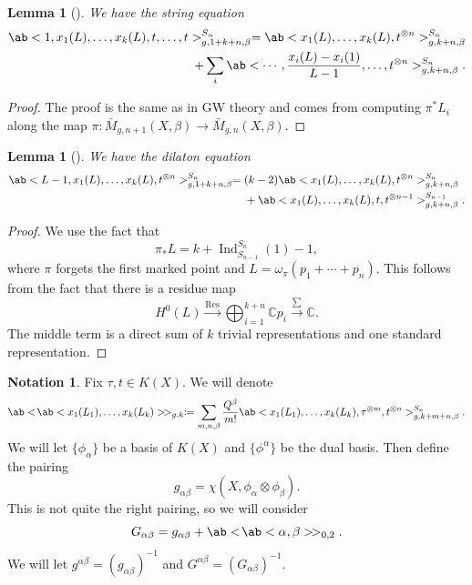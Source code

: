 \documentclass{amsart}
\newtheorem{lem}[thm]{Lemma}
\theoremstyle{definition}
\newtheorem{notn}[thm]{Notation}
\theoremstyle{remark}
\theoremstyle{plain}
\theoremstyle{definition}
\theoremstyle{remark}
\newcommand{\C}{\mathbb{C}}
\newcommand{\on}[1]{\operatorname{#1}}
\newcommand{\1}{\mathbf{1}}
\newcommand{\2}{\mathbf{2}}
\newcommand{\3}{\mathbf{3}}
\begin{document}
\begin{lem}[{\cite{GiventalK7}}]
    We have the \textit{string equation}
    \begin{align*}
        \ab< 1, x_1(L), \ldots, x_k(L), t, \ldots, t >_{g, 1+k+n, \beta}^{S_n} = \ab<x_1(L), \ldots, x_k(L), t^{\otimes n}>^{S_n}_{g,k+n,\beta} \\
        + \sum_i \ab< \cdots, \frac{x_i(L) - x_i(1)}{L-1}, \ldots, t^{\otimes n}>^{S_n}_{g,k+n,\beta}. 
    \end{align*}
\end{lem}

\begin{proof}
    The proof is the same as in GW theory and comes from computing \(\pi^* L_i\) along the map \(\pi \colon\bar{M}_{g,n+1}(X,\beta) \to \bar{M}_{g,n}(X,\beta)\).
\end{proof}

\begin{lem}[{\cite{GiventalK7}}]
    We have the \textit{dilaton equation}
    \begin{align*}
        \ab<L-1, x_1(L), \ldots, x_k(L), t^{\otimes n}>_{g,1+k+n,\beta}^{S_n} ={}& (k-2)\ab<x_1(L), \ldots, x_k(L), t^{\otimes n}>_{g,k+n,\beta}^{S_n} \\
        &+ \ab<x_1(L), \ldots, x_k(L), t, t^{\otimes n-1}>_{g,k+n,\beta}^{S_{n-1}}.
    \end{align*}
\end{lem}

\begin{proof}
    We use the fact that
    \[ \pi_* L = k + \on{Ind}_{S_{n-1}}^{S_n}(1) - 1, \]
    where \(\pi\) forgets the first marked point and \(L = \omega_{\pi} (p_1 + \cdots + p_n)\). This follows from the fact that there is a residue map
    \[ H^0(L) \xrightarrow{\on{Res}} \bigoplus_{i=1}^{k+n} \C p_i \xrightarrow{\sum} \C. \]
    The middle term is a direct sum of \(k\) trivial representations and one standard representation.
\end{proof}

\begin{notn}
    Fix \(\tau, t \in K(X)\). We will denote
    \[ \ab<\!\ab<x_1(L_1), \ldots, x_k(L_k)>\!>_{g,k} \coloneqq \sum_{m,n,\beta} \frac{Q^{\beta}}{m!} \ab<x_1(L_1), \ldots, x_k(L_k), \tau^{\otimes m}, t^{\otimes n}>_{g,k+m+n,\beta}^{S_n}. \]
    We will let \(\{\phi_{\alpha}\}\) be a basis of \(K(X)\) and \(\{\phi^{\alpha}\}\) be the dual basis. Then define the pairing
    \[ g_{\alpha\beta} = \chi(X, \phi_{\alpha} \otimes \phi_{\beta}). \]
    This is not quite the right pairing, so we will consider
    \[ G_{\alpha\beta} = g_{\alpha\beta} + \ab<\!\ab<\alpha,\beta>\!>_{0,2}. \]
    We will let \(g^{\alpha\beta} = (g_{\alpha\beta})^{-1}\) and \(G^{\alpha\beta} = (G_{\alpha\beta})^{-1}\).
\end{notn}
\end{document}
